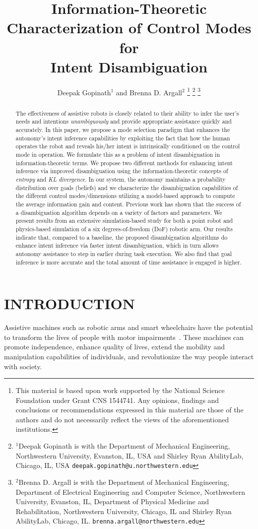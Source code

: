 \documentclass[letterpaper, 10 pt, conference]{ieeeconf}  %
\title{\LARGE \bf
Information-Theoretic Characterization of Control Modes for\\ Intent Disambiguation
}
\author{Deepak Gopinath$^{1}$ and Brenna D. Argall$^{2}$%
\thanks{This material is based upon work supported by the National Science Foundation under Grant CNS 1544741. Any opinions, findings and conclusions or
	recommendations expressed in this material are those of the authors and do
	not necessarily reflect the views of the aforementioned institutions. 
}%
\thanks{$^{1}$Deepak Gopinath is with the Department of Mechanical Engineering, Northwestern University, Evanston, IL, USA and Shirley Ryan AbilityLab, Chicago, IL, USA
        {\tt\small deepak.gopinath@u.northwestern.edu}}%
\thanks{$^{2}$Brenna D. Argall is with the Department of Mechanical Engineering, Department of Electrical Engineering and Computer Science, Northwestern University, Evanston, IL, Department of Physical Medicine and Rehabilitation, Northwestern University, Chicago, IL and Shirley Ryan AbilityLab, Chicago, IL.
        {\tt\small brenna.argall@northwestern.edu}}%
}
\begin{document}
\maketitle
\thispagestyle{empty}
\pagestyle{empty}


\begin{abstract}
The effectiveness of assistive robots is closely related to their ability to infer the user's needs and intentions \textit{unambiguously} and provide appropriate assistance quickly and accurately. In this paper, we propose a mode selection paradigm that enhances the autonomy's intent inference capabilities by exploiting the fact that how the human operates the robot and reveals his/her intent is intrinsically conditioned on the control mode in operation. We formulate this as a problem of intent disambiguation in information-theoretic terms.  We propose two different methods for enhancing intent inference via improved disambiguation using the information-theoretic concepts of \textit{entropy} and \textit{KL divergence}. In our system, the autonomy maintains a probability distribution over goals (beliefs) and we characterize the disambiguation capabilities of the different control modes/dimensions utilizing a model-based approach to compute the average information gain and content. 
Previous work has shown that the success of a disambiguation algorithm depends on a variety of factors and parameters. 
We present results from an extensive simulation-based study for both a point robot and physics-based simulation of a six degrees-of-freedom (DoF) robotic arm. Our results indicate that, compared to a baseline, the proposed disambiguation algorithms do enhance intent inference via faster intent disambiguation, which in turn allows autonomy assistance to step in earlier during task execution. We also find that goal inference is more accurate and the total amount of time assistance is engaged is higher.
\end{abstract}


\section{INTRODUCTION}
Assistive machines such as robotic arms and smart wheelchairs have the potential to transform the lives of people with motor impairments~\cite{laplante1992assistive}. These machines can promote independence, enhance quality of lives, extend the mobility and manipulation capabilities of individuals, and revolutionize the way people interact with society. 
\end{document}
